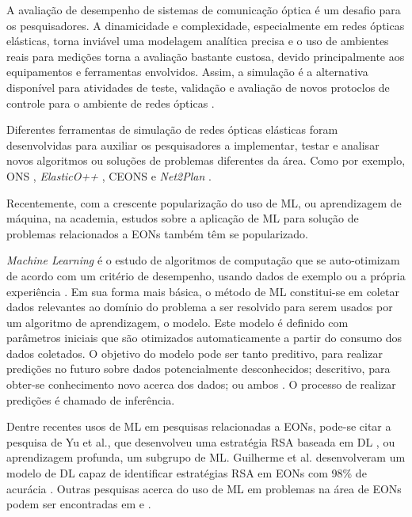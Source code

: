 A avaliação de desempenho de sistemas de comunicação óptica é um desafio para os pesquisadores. A dinamicidade e complexidade, especialmente em redes ópticas elásticas, torna inviável uma modelagem analítica precisa e o uso de ambientes reais para medições torna a avaliação bastante custosa, devido principalmente aos equipamentos e ferramentas envolvidos. Assim, a simulação é a alternativa disponível para atividades de teste, validação e avaliação de novos protoclos de controle para o ambiente de redes ópticas \cite{costa2016ons}.

Diferentes ferramentas de simulação de redes ópticas elásticas foram desenvolvidas para auxiliar os pesquisadores a implementar, testar e analisar novos algoritmos ou soluções de problemas diferentes da área. Como por exemplo, \acrfull{ONS} \cite{costa2016ons}, \textit{ElasticO++} \cite{TESSINARI201695}, \acrfull{CEONS} \cite{ceons2015} e \textit{Net2Plan} \cite{net2plan}.

Recentemente, com a crescente popularização do uso de \acrfull{ML}, ou aprendizagem de máquina, na academia, estudos sobre a aplicação de ML para solução de problemas relacionados a EONs também têm se popularizado.

\textit{Machine Learning} é o estudo de algoritmos de computação que se auto-otimizam de acordo com um critério de desempenho, usando dados de exemplo ou a própria experiência \cite{mitchell1997ml, alpaydin2020introduction}. Em sua forma mais básica, o método de ML constitui-se em coletar dados relevantes ao domínio do problema a ser resolvido para serem usados por um algoritmo de aprendizagem, o modelo. Este modelo é definido com parâmetros iniciais que são otimizados automaticamente a partir do consumo dos dados coletados. O objetivo do modelo pode ser tanto preditivo, para realizar predições no futuro sobre dados potencialmente desconhecidos; descritivo, para obter-se conhecimento novo acerca dos dados; ou ambos \cite{alpaydin2020introduction, brief_introduction_to_ml}. O processo de realizar predições é chamado de inferência.

Dentre recentes usos de ML em pesquisas relacionadas a EONs, pode-se citar a pesquisa de Yu et al., que desenvolveu uma estratégia RSA baseada em \acrfull{DL} \cite{eon_ml_rsa_dl_2019}, ou aprendizagem profunda, um subgrupo de ML. Guilherme et al. desenvolveram um modelo de DL capaz de identificar estratégias RSA em EONs com 98\% de acurácia \cite{eon_ml_classifier_2020}. Outras pesquisas acerca do uso de ML em problemas na área de EONs podem ser encontradas em \cite{eon_ml_recent_2019} e \cite{eon_ml_survey_2020}.

